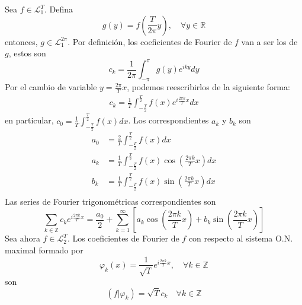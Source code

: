 \documentclass[12pt]{report}
\theoremstyle{largebreak}
\newcommand\pint[2]{\ensuremath{\left(#1\big| #2\right)}}
\begin{document}
    Sea $f\in\mathcal{L}_1^T$. Defina
    \begin{equation*}
        g(y)=f\left(\frac{T}{2\pi}y\right),\quad\forall y\in\mathbb{R}
    \end{equation*}
    entonces, $g\in\mathcal{L}_1^{2\pi}$. Por definición, los coeficientes de Fourier de $f$ van a ser los de $g$, estos son
    \begin{equation*}
        c_k=\frac{1}{2\pi}\int_{-\pi}^\pi g(y)e^{ iky}dy
    \end{equation*}
    Por el cambio de variable $y=\frac{2\pi}{T}x$, podemos reescribirlos de la siguiente forma:
    \begin{equation*}
        \begin{split}
            c_k=\frac{1}{T}\int_{ -\frac{T}{2}}^{\frac{T}{2}}f(x)e^{ i\frac{2\pi k}{T}x}dx
        \end{split}
    \end{equation*}
    en particular, $c_0=\frac{1}{T}\int_{ -\frac{T}{2}}^{\frac{T}{2}}f(x)dx$. Los correspondientes $a_k$ y $b_k$ son 
    \begin{equation*}
        \begin{split}
            a_0&=\frac{2}{T}\int_{ -\frac{T}{2}}^{\frac{T}{2}}f(x)dx\\
            a_k&=\frac{1}{T}\int_{ -\frac{T}{2}}^{\frac{T}{2}}f(x)\cos\left(\frac{2\pi k}{T}x \right)dx\\
            b_k&=\frac{1}{T}\int_{ -\frac{T}{2}}^{\frac{T}{2}}f(x)\sin\left(\frac{2\pi k}{T}x \right)dx\\
        \end{split}
    \end{equation*}
    Las series de Fourier trigonométricas correspondientes son
    \begin{equation*}
        \sum_{ k\in\mathbb{Z}}c_ke^{i\frac{2\pi k}{T}x}=\frac{a_0}{2}+\sum_{ k=1}^\infty\left[a_k\cos\left(\frac{2\pi k}{T}x \right)+b_k\sin\left(\frac{2\pi k}{T}x \right)\right]
    \end{equation*}
    Sea ahora $f\in\mathcal{L}_2^T$. Los coeficientes de Fourier de $f$ con respecto al sistema O.N. maximal formado por
    \begin{equation*}
        \varphi_k(x)=\frac{1}{\sqrt{T}}e^{ i\frac{2\pi k}{T}x},\quad\forall k\in\mathbb{Z}
    \end{equation*}
    son
    \begin{equation*}
        \pint{f}{\varphi_k}=\sqrt{T}c_k\quad\forall k\in\mathbb{Z}
    \end{equation*}
\end{document}
